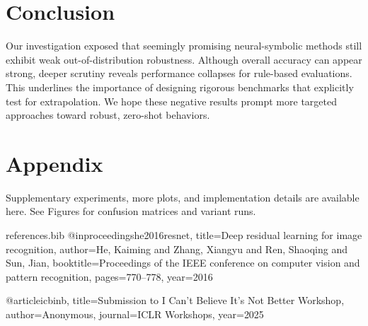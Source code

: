 \documentclass{article}
\begin{document}
\section{Conclusion}
Our investigation exposed that seemingly promising neural-symbolic methods still exhibit weak out-of-distribution robustness. Although overall accuracy can appear strong, deeper scrutiny reveals performance collapses for rule-based evaluations. This underlines the importance of designing rigorous benchmarks that explicitly test for extrapolation. We hope these negative results prompt more targeted approaches toward robust, zero-shot behaviors.

\clearpage
\appendix
\section*{Appendix}
Supplementary experiments, more plots, and implementation details are available here. See Figures for confusion matrices and variant runs.

\begin{filecontents}{references.bib}
@inproceedings{he2016resnet,
  title={Deep residual learning for image recognition},
  author={He, Kaiming and Zhang, Xiangyu and Ren, Shaoqing and Sun, Jian},
  booktitle={Proceedings of the IEEE conference on computer vision and pattern recognition},
  pages={770--778},
  year={2016}
}

@article{icbinb,
  title={Submission to I Can't Believe It's Not Better Workshop},
  author={Anonymous},
  journal={ICLR Workshops},
  year={2025}
}
\end{filecontents}



\end{document}
